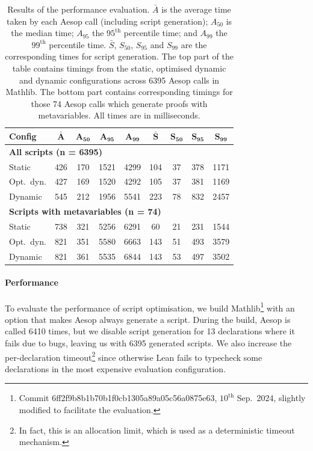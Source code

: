 \documentclass[sigplan,screen]{acmart}
\begin{document}
\begin{table}
  \caption{Results of the performance evaluation.
    $\bar{A}$ is the average time taken by each Aesop call (including script generation); $A_{50}$ is the median time; $A_{95}$ the $95^{\mathrm{th}}$ percentile time; and $A_{99}$ the $99^{\mathrm{th}}$ percentile time.
    $\bar{S}$, $S_{50}$, $S_{95}$ and $S_{99}$ are the corresponding times for script generation.
    The top part of the table contains timings from the static, optimised dynamic and dynamic configurations across 6395 Aesop calls in Mathlib.
    The bottom part contains corresponding timings for those 74 Aesop calls which generate proofs with metavariables.
    All times are in milliseconds.}%
  \label{table:evaluation}
  \centering
  \small
  \begin{tabular}{lcccc|cccc}
    \textbf{Config} & $\mathbf{\bar{A}}$ & $\mathbf{A_{50}}$ & $\mathbf{A_{95}}$ & $\mathbf{A_{99}}$ & $\mathbf{\bar{S}}$ & $\mathbf{S_{50}}$ & $\mathbf{S_{95}}$ & $\mathbf{S_{99}}$ \\
    \midrule
    \multicolumn{9}{l}{\textbf{All scripts (n = 6395)}} \\
    Static     & 426 & 170 & 1521 & 4299 & 104 & 37 & 378 & 1171 \\
    Opt.\ dyn. & 427 & 169 & 1520 & 4292 & 105 & 37 & 381 & 1169 \\
    Dynamic    & 545 & 212 & 1956 & 5541 & 223 & 78 & 832 & 2457 \\
    \midrule
    \multicolumn{9}{l}{\textbf{Scripts with metavariables (n = 74)}} \\
    Static     & 738 & 321 & 5256 & 6291 & 60  & 21 & 231 & 1544 \\
    Opt.\ dyn. & 821 & 351 & 5580 & 6663 & 143 & 51 & 493 & 3579 \\
    Dynamic    & 821 & 361 & 5535 & 6844 & 143 & 53 & 497 & 3502 \\
  \end{tabular}
\end{table}

\paragraph{Performance}
To evaluate the performance of script optimisation, we build Mathlib\footnote{Commit 6ff2f9b8b1b70b1f0cb1305a89a05c56a0875e63, $10^{\mathrm{th}}$ Sep.\ 2024, slightly modified to facilitate the evaluation.} with an option that makes Aesop always generate a script.
During the build, Aesop is called 6410 times, but we disable script generation for 13 declarations where it fails due to bugs, leaving us with 6395 generated scripts.
We also increase the per-declaration timeout\footnote{In fact, this is an allocation limit, which is used as a deterministic timeout mechanism.} since otherwise Lean fails to typecheck some declarations in the most expensive evaluation configuration.
\end{document}
